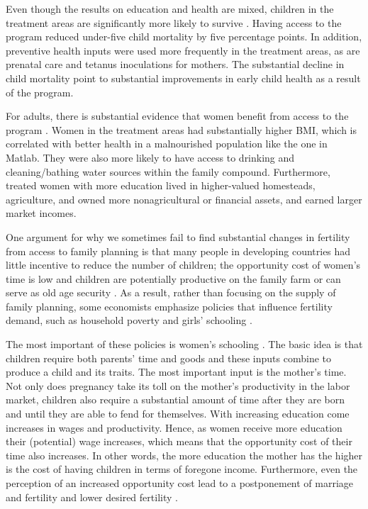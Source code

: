 \documentclass[]{article}
\begin{document}
Even though the results on education and health are mixed, children in the treatment areas are significantly more likely to survive \citep{Joshi2007}. Having access to the program reduced under-five child mortality by five percentage points. In addition, preventive health inputs were used more frequently in the treatment areas, as are prenatal care and tetanus inoculations for mothers. The substantial decline in child mortality point to substantial improvements in early child health as a result of the program.

For adults, there is substantial evidence that women benefit from access to the program \citep{Joshi2007}. Women in the treatment areas had substantially higher BMI, which is correlated with better health in a malnourished population like the one in Matlab. They were also more likely to have access to drinking and cleaning/bathing water sources within the family compound. Furthermore, treated women with more education lived in higher-valued homesteads, agriculture, and owned more nonagricultural or financial assets, and earned larger market incomes.

One argument for why we sometimes fail to find substantial changes in fertility from access to family planning is that many people in developing countries had little incentive to reduce the number of children; the opportunity cost of women's time is low and children are potentially productive on the family farm or can serve as old age security \citep{Banerjee2014,Lambert2016}. As a result, rather than focusing on the supply of family planning, some economists emphasize policies that influence fertility demand, such as household poverty and girls' schooling \citep{pritchett94a,DasGupta2011}.

The most important of these policies is women's schooling \citep{schultz02}. The basic idea is that children require both parents' time and goods and these inputs combine to produce a child and its traits. The most important input is the mother's time. Not only does pregnancy take its toll on the mother's productivity in the labor market, children also require a substantial amount of time after they are born and until they are able to fend for themselves. With increasing education come increases in wages and productivity. Hence, as women receive more education their (potential) wage increases, which means that the opportunity cost of their time also increases. In other words, the more education the mother has the higher is the cost of having children in terms of foregone income. Furthermore, even the perception of an increased opportunity cost lead to a postponement of marriage and fertility and lower desired fertility \citep{Jensen2012}.
\end{document}

